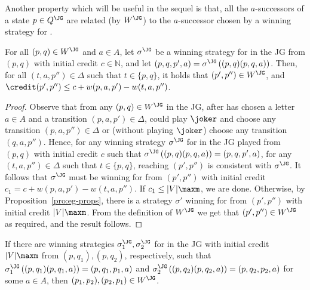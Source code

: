 \documentclass[a4paper]{article}
\begin{document}
Another property which will be useful in the sequel is that, all the
$a$-successors of a state $p \in Q^{\JG}$ are related (by $W^{\JG}$) to the
$a$-successor chosen by a winning strategy for \eve.
\begin{lemma}\label{lem:joking}
	For all
	$(p,q) \in W^{\JG}$ and $a \in A$, let $\sigma^{\JG}$ be a winning
	strategy for \eve in the JG from $(p,q)$ with initial credit $c \in
	\mathbb{N}$, and let $(p,q,p',a) = \sigma^{\JG}\left((p,q) (p,q,a)\right)$.
	Then, for all $(t,a,p'') \in \Delta$ such that $t \in \{p,q\}$, it holds
	that $(p',p'') \in W^{\JG}$, and $\credit(p',p'') \leq c + w(p,a,p') -
	w(t,a,p'')$.
\end{lemma}
\begin{proof}
	Observe that from any $(p,q) \in W^{\JG}$ in the JG, after \adam has
	chosen a letter $a \in A$ and \eve a transition $(p,a,p') \in \Delta$,
	\adam could play $\joker$ and choose any transition $(p,a,p'') \in
	\Delta$ or (without playing $\joker$) choose any transition $(q,a,p'')$.
	Hence, for any winning strategy $\sigma^{\JG}$ for \eve in the JG played
	from $(p,q)$ with initial credit $c$ such that $\sigma^{\JG}\left(
	(p,q)(p,q,a) \right) = (p,q,p',a)$, for any $(t,a,p'') \in \Delta$ such
	that $t \in \{p,q\}$, reaching $(p',p'')$ is consistent with
	$\sigma^{\JG}$. It follows that $\sigma^{\JG}$ must be winning for \eve
	from $(p',p'')$ with initial credit $c_1 = c + w(p,a,p') - w(t,a,p'')$.
	If $c_1 \leq |V|\maxm$, we are done.  Otherwise, by
	Proposition~\ref{pro:eg-props}, there is a strategy $\sigma'$ winning
	for \eve from $(p',p'')$ with initial credit $|V|\maxm$. From the
	definition of $W^{\JG}$ we get that $(p',p'') \in W^{\JG}$ as required,
	and the result follows.
\end{proof}

\begin{corollary}\label{cor:rel-two-strats}
	If there are winning strategies $\sigma^{\JG}_1,\sigma^{\JG}_2$ for \eve
	in the JG with initial credit $|V|\maxm$ from $(p,q_1),(p,q_2)$,
	respectively, such that
	$\sigma^{\JG}_1\left( (p,q_1)(p,q_1,a)\right) = (p,q_1,p_1,a)$ and
	$\sigma^{\JG}_2\left( (p,q_2)(p,q_2,a)\right) = (p,q_2,p_2,a)$
	for some $a \in A$,
	then $(p_1,p_2),(p_2,p_1) \in W^{\JG}$.
\end{corollary}
\end{document}
